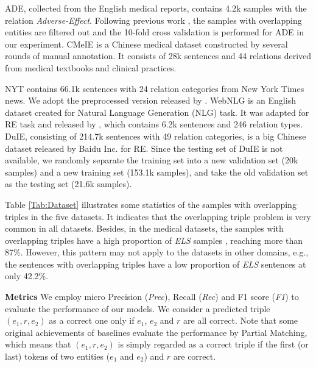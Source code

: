 \documentclass[conference]{IEEEtran}
\begin{document}
ADE, collected from the English medical reports, contains 4.2k samples with the relation \emph{Adverse-Effect}. Following previous work \cite{Yan2021A}, the samples with overlapping entities are filtered out and the 10-fold cross validation is performed for ADE in our experiment. CMeIE is a Chinese medical dataset constructed by several rounds of manual annotation. It consists of 28k sentences and 44 relations derived from medical textbooks and clinical practices. 

NYT contains 66.1k sentences with 24 relation categories from New York Times news. We adopt the preprocessed version released by \cite{Zeng2018Extracting}. WebNLG is an English dataset created for Natural Language Generation (NLG) task. It was adapted for RE task and released by \cite{Zeng2018Extracting}, which contains 6.2k sentences and 246 relation types. DuIE, consisting of 214.7k sentences with 49 relation categories, is a big Chinese dataset released by Baidu Inc. for RE. Since the testing set of DuIE is not available, we randomly separate the training set into a new validation set (20k samples) and a new training set (153.1k samples), and take the old validation set as the testing set (21.6k samples).


Table \ref{Tab:Dataset} illustrates some statistics of the samples with overlapping triples in the five datasets. It indicates that the overlapping triple problem is very common in all datasets. Besides, in the medical datasets, the samples with overlapping triples have a high proportion of \emph{ELS} samples , reaching more than 87\%. However, this pattern may not apply to the datasets in other domains, e.g., the sentences with overlapping triples have a low proportion of \emph{ELS} sentences at only 42.2\%.


\textbf{Metrics}
We employ micro Precision (\emph{Prec}), Recall (\emph{Rec}) and F1 score (\emph{F1}) to evaluate the performance of our models. We consider a predicted triple $(e_1, r, e_2)$ as a correct one only if $e_1$, $e_2$ and $r$ are all correct. Note that some original achievements of baselines evaluate the performance by Partial Matching, which means that $(e_1, r, e_2)$ is simply regarded as a correct triple if the first (or last) tokens of two entities ($e_1$ and $e_2$) and $r$ are correct.
\end{document}
